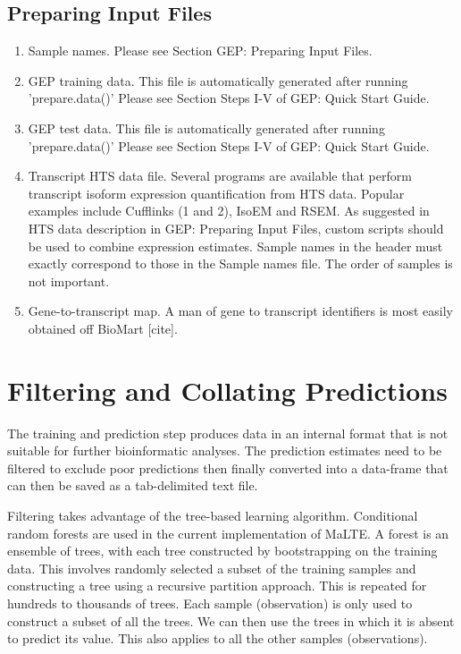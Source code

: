 \documentclass[a4paper,12pt]{article}
\begin{document}
\subsection{Preparing Input Files}
\begin{enumerate}
\item Sample names. Please see Section GEP: Preparing Input Files.

\item GEP training data. This file is automatically generated after running 'prepare.data()' Please see Section Steps I-V of GEP: Quick Start Guide.

\item GEP test data. This file is automatically generated after running 'prepare.data()' Please see Section Steps I-V of GEP: Quick Start Guide.

\item Transcript HTS data file. Several programs are available that perform transcript isoform expression quantification from HTS data. Popular examples include Cufflinks (1 and 2), IsoEM and RSEM. As suggested in HTS data description in GEP: Preparing Input Files, custom scripts should be used to combine expression estimates. Sample names in the header must exactly correspond to those in the Sample names file. The order of samples is not important.

\item Gene-to-transcript map. A man of gene to transcript identifiers is most easily obtained off BioMart [cite].
\end{enumerate}

\section{Filtering and Collating Predictions}
The training and prediction step produces data in an internal format that is not suitable for further bioinformatic analyses. The prediction estimates need to be filtered to exclude poor predictions then finally converted into a data-frame that can then be saved as a tab-delimited text file.

Filtering takes advantage of the tree-based learning algorithm. Conditional random forests are used in the current implementation of MaLTE. A forest is an ensemble of trees, with each tree constructed by bootstrapping on the training data. This involves randomly selected a subset of the training samples and constructing a tree using a recursive partition approach. This is repeated for hundreds to thousands of trees. Each sample (observation) is only used to construct a subset of all the trees. We can then use the trees in which it is absent to predict its value. This also applies to all the other samples (observations).
\end{document}
